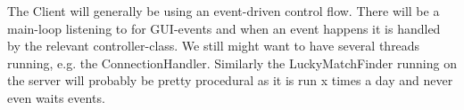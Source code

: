 The Client will generally be using an event-driven control flow. There will be a main-loop listening to for GUI-events and when an event happens it is handled by the relevant controller-class. We still might want to have several threads running, e.g. the ConnectionHandler. Similarly the LuckyMatchFinder running on the server will probably be pretty procedural as it is run x times a day and never even waits events.
